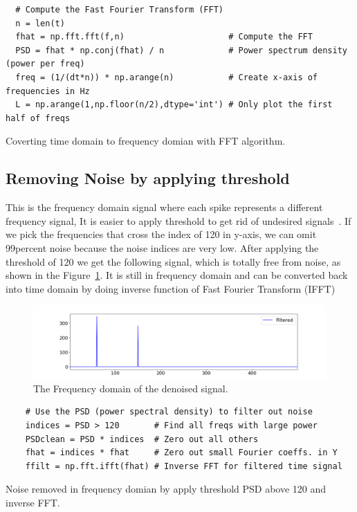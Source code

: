 \documentclass[a4paper, 12pt]{scrartcl}
\begin{document}
\begin{listing}[h]
  \begin{verbatim}
  # Compute the Fast Fourier Transform (FFT)
  n = len(t)
  fhat = np.fft.fft(f,n)                     # Compute the FFT
  PSD = fhat * np.conj(fhat) / n             # Power spectrum density (power per freq)
  freq = (1/(dt*n)) * np.arange(n)           # Create x-axis of frequencies in Hz
  L = np.arange(1,np.floor(n/2),dtype='int') # Only plot the first half of freqs
  \end{verbatim}
  \caption{Coverting time domain to frequency domian with FFT algorithm.}
  \label{listing:time_to_freq}
  \end{listing}

  \subsection{Removing Noise by applying threshold}

  This is the frequency domain signal where each spike represents a different frequency signal, 
  It is easier to apply threshold to get rid of undesired signals~\cite{fftfilter}.  
  If we pick the frequencies that cross the index of 120 in y-axis, 
  we can omit 99percent noise because the noise indices are very low. 
  After applying the threshold of 120 we get the following signal, 
  which is totally free from noise, as shown in the Figure~\ref{fig:denoise_freq}. 
  It is still in frequency domain and can be converted back into time domain by doing inverse function of Fast Fourier Transform (IFFT)
  \begin{figure}[H] 
    \centering
    \includegraphics[width=\textwidth]{img/denoise_freq.png}
    \caption{The Frequency domain of the denoised signal.}
    \label{fig:denoise_freq}
  \end{figure}
  
  \begin{listing}[H]
    \begin{verbatim}
    # Use the PSD (power spectral density) to filter out noise
    indices = PSD > 120       # Find all freqs with large power
    PSDclean = PSD * indices  # Zero out all others
    fhat = indices * fhat     # Zero out small Fourier coeffs. in Y
    ffilt = np.fft.ifft(fhat) # Inverse FFT for filtered time signal
    \end{verbatim}
    \caption{Noise removed in frequency domian by apply threshold PSD above 120 and inverse FFT.}
    \label{listing:denoise_freq}
    \end{listing}
\end{document}
